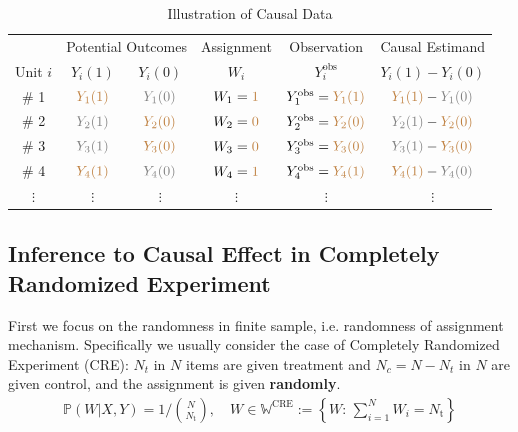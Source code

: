         \begin{table}[H]
            \centering
            \renewcommand\arraystretch{1}
            \caption{Illustration of Causal Data}
            \begin{tabular}{cccccc}
                \hline
                \hline
                &\multicolumn{2}{c}{Potential Outcomes}&Assignment&Observation&Causal Estimand\\
                \cline{2-3}
                Unit $ i $&$ Y_i(1) $&$ Y_i(0) $&$ W_i $&$ Y^\mathrm{obs}_i  $&$ Y_i(1)-Y_i(0) $\\
                \hline
                \# 1&$ \color{brown}Y_1(1) $&$ \color{gray}Y_1(0) $&$ W_1={\color{brown}1} $&$ Y^\mathrm{obs}_1=\color{brown}Y_1(1)  $&$ {\color{brown}Y_1(1)}-{\color{gray}Y_1(0)} $\\
                \# 2&$ \color{gray}Y_2(1) $&$ \color{brown}Y_2(0) $&$ W_2={\color{brown}0} $&$ Y^\mathrm{obs}_2=\color{brown}Y_2(0)  $&$ {\color{gray}Y_2(1)}-{\color{brown}Y_2(0)} $\\
                \# 3&$ \color{gray}Y_3(1) $&$ \color{brown}Y_3(0) $&$ W_3={\color{brown}0} $&$ Y^\mathrm{obs}_3=\color{brown}Y_3(0)  $&$ {\color{gray}Y_3(1)}-{\color{brown}Y_3(0)} $\\
                \# 4&$ \color{brown}Y_4(1) $&$ \color{gray}Y_4(0) $&$ W_4={\color{brown}1} $&$ Y^\mathrm{obs}_4=\color{brown}Y_4(1)  $&$ {\color{brown}Y_4(1)}-{\color{gray}Y_4(0)} $\\
                $ \vdots $&$ \vdots $&$ \vdots $&$ \vdots $&$ \vdots $&$ \vdots $\\
                \hline
                \hline
            \end{tabular}
            \label{}
        \end{table}
    

    


\subsection{Inference to Causal Effect in Completely Randomized Experiment}

First we focus on the randomness in finite sample, i.e. randomness of assignment mechanism. Specifically we usually consider the case of Completely Randomized Experiment (CRE): $ N_t $ in $ N $ items are given treatment and $ N_c=N-N_t $ in $ N $ are given control, and the assignment is given \textbf{randomly}. 
\begin{align}
    \mathbb{P}\left( W|X,Y \right)=1\bigg/\binom{N}{N_\mathrm{t} },\quad W\in\mathbb{W}^\mathrm{CRE}:=\left\{W:\,\sum_{i=1}^NW_i=N_\mathrm{t}\right\}
\end{align}

